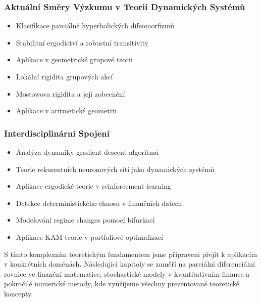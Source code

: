 \subsubsection{Aktuální Směry Výzkumu v Teorii Dynamických Systémů}

\begin{researcharea}
\begin{itemize}
\item Klasifikace parciálně hyperbolických difeomorfizmů
\item Stabilitní ergodictví a robustní transitivity
\item Aplikace v geometrické grupové teorii
\end{itemize}
\end{researcharea}

\begin{researcharea}
\begin{itemize}
\item Lokální rigidita grupových akcí
\item Mostowova rigidita a její zobecnění
\item Aplikace v aritmetické geometrii
\end{itemize}
\end{researcharea}

\subsubsection{Interdisciplinární Spojení}

\begin{application}
\begin{itemize}
\item Analýza dynamiky gradient descent algoritmů
\item Teorie rekurentních neuronových sítí jako dynamických systémů
\item Aplikace ergodické teorie v reinforcement learning
\end{itemize}
\end{application}

\begin{application}
\begin{itemize}
\item Detekce deterministického chaosu v finančních datech
\item Modelování regime changes pomocí bifurkací
\item Aplikace KAM teorie v portfoliové optimalizaci
\end{itemize}
\end{application}

\begin{transition}
S tímto komplexním teoretickým fundamentem jsme připraveni přejít k aplikacím v konkrétních doménách. Následující kapitoly se zaměří na parciální diferenciální rovnice ve finanční matematice, stochastické modely v kvantitativním finance a pokročilé numerické metody, kde využijeme všechny prezentované teoretické koncepty.
\end{transition}